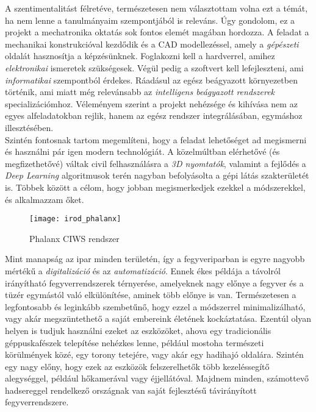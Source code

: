 A szentimentalitást félretéve, természetesen nem választottam volna ezt a témát, ha nem lenne a tanulmányaim szempontjából is releváns. Úgy gondolom, ez a projekt a mechatronika oktatás sok fontos elemét magában hordozza. A feladat a mechanikai konstrukcióval kezdődik és a CAD modellezéssel, amely a \textsl{gépészeti} oldalát hasznosítja a képzésünknek. Foglakozni kell a hardverrel, amihez \textsl{elektronikai} ismeretek szükségesek. Végül pedig a szoftvert kell lefejleszteni, ami \textsl{informatikai} szempontból érdekes. Ráadásul az egész beágyazott környezetben történik, ami miatt még relevánsabb az \textsl{intelligens beágyazott rendszerek} specializációmhoz. Véleményem szerint a projekt nehézsége és kihívása nem az egyes alfeladatokban rejlik, hanem az egész rendszer integrálásában, egymáshoz illesztésében. \\

Szintén fontosnak tartom megemlíteni, hogy a feladat lehetőséget ad megismerni és használni pár igen modern technológiát. A közelmúltban elérhetővé (és megfizethetővé) váltak civil felhasználásra a \textsl{3D nyomtatók}, valamint a fejlődés a \textsl{Deep Learning} algoritmusok terén nagyban befolyásolta a gépi látás szakterületét is. Többek között a célom, hogy jobban megismerkedjek ezekkel a módszerekkel, és alkalmazzam őket.\\

\begin{figure}[h!]
	\centering
	\texttt{[image: irod\_phalanx]} 
	\caption{Phalanx CIWS rendszer \cite{CIWS}}
	\label{fig:irod_phalanx}
\end{figure}

Mint manapság az ipar minden területén, így a fegyveriparban is egyre nagyobb mértékű a \textsl{digitalizáció} és az \textsl{automatizáció}. Ennek ékes példája a távolról irányítható fegyverrendszerek térnyerése, amelyeknek nagy előnye a fegyver és a tüzér egymástól való elkülönítése, aminek több előnye is van. Természetesen a legfontosabb és leginkább szembetűnő, hogy ezzel a módszerrel minimalizálható, vagy akár megszüntethető a saját embereink életének kockáztatása. Ezentúl olyan helyen is tudjuk használni ezeket az eszközöket, ahova egy tradicionális géppuskafészek telepítése nehézkes lenne, például mostoha természeti körülmények közé, egy torony tetejére, vagy akár egy hadihajó oldalára. Szintén egy nagy előny, hogy ezek az eszközök felszerelhetők több kezeléssegítő alegységgel, például hőkamerával vagy éjjellátóval. Majdnem minden, számottevő hadsereggel rendelkező országnak van saját fejlesztésű távirányított fegyverrendszere.\\

